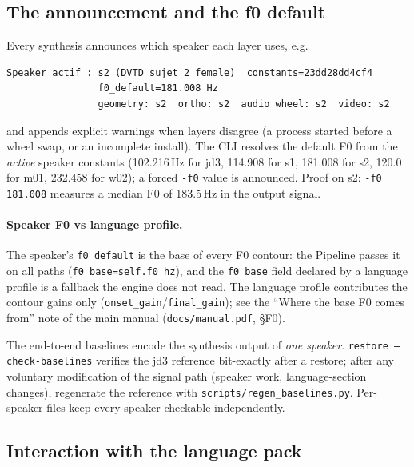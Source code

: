 \documentclass[11pt,a4paper]{article}
\newcommand{\code}[1]{\texttt{#1}}
\begin{document}
\subsection{The announcement and the f0 default}

Every synthesis announces which speaker each layer uses, e.g.

\begin{lstlisting}[style=verbatim]
Speaker actif : s2 (DVTD sujet 2 female)  constants=23dd28dd4cf4
                f0_default=181.008 Hz
                geometry: s2  ortho: s2  audio wheel: s2  video: s2
\end{lstlisting}

and appends explicit warnings when layers disagree (a process started
before a wheel swap, or an incomplete install). The CLI resolves the
default F0 from the \emph{active} speaker constants
(102.216\,Hz for jd3, 114.908 for s1, 181.008 for s2, 120.0 for m01,
232.458 for w02); a forced \texttt{-f0} value is announced. Proof on
s2: \texttt{-f0 181.008} measures a median F0 of 183.5\,Hz in the
output signal.

\paragraph{Speaker F0 vs language profile.} The speaker's
\texttt{f0\_default} is the base of every F0 contour: the Pipeline
passes it on all paths (\texttt{f0\_base=self.f0\_hz}), and the
\texttt{f0\_base} field declared by a language profile is a fallback
the engine does not read. The language profile contributes the contour
gains only (\texttt{onset\_gain}/\texttt{final\_gain}); see the
``Where the base F0 comes from'' note of the main manual
(\code{docs/manual.pdf}, \S F0).

\begin{callout}
The end-to-end baselines encode the synthesis output of
\emph{one speaker}. \code{restore --check-baselines} verifies the
jd3 reference bit-exactly after a restore; after any voluntary
modification of the signal path (speaker work, language-section
changes), regenerate the reference with
\code{scripts/regen\_baselines.py}. Per-speaker files keep every
speaker checkable independently.
\end{callout}

\subsection{Interaction with the language pack}
\end{document}
